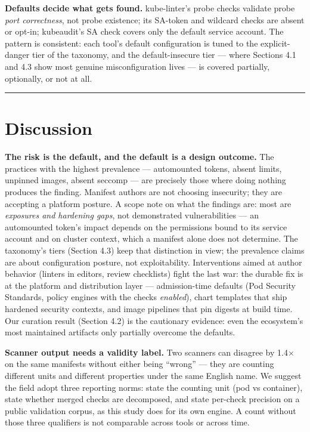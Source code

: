 \documentclass[pdflatex,sn-basic]{sn-jnl}
\begin{document}
\textbf{Defaults decide what gets found.} kube-linter's probe checks
validate probe \emph{port correctness}, not probe existence; its
SA-token and wildcard checks are absent or opt-in; kubeaudit's SA check
covers only the default service account. The pattern is consistent: each
tool's default configuration is tuned to the explicit-danger tier of the
taxonomy, and the default-insecure tier --- where Sections 4.1 and 4.3
show most genuine misconfiguration lives --- is covered partially,
optionally, or not at all.

\FloatBarrier

\begin{center}\rule{0.5\linewidth}{0.5pt}\end{center}

\hypertarget{discussion}{%
\section{Discussion}\label{discussion}}

\textbf{The risk is the default, and the default is a design outcome.}
The practices with the highest prevalence --- automounted tokens, absent
limits, unpinned images, absent seccomp --- are precisely those where
doing nothing produces the finding. Manifest authors are not choosing
insecurity; they are accepting a platform posture. A scope note on what
the findings are: most are \emph{exposures and hardening gaps}, not
demonstrated vulnerabilities --- an automounted token's impact depends
on the permissions bound to its service account and on cluster context,
which a manifest alone does not determine. The taxonomy's tiers (Section
4.3) keep that distinction in view; the prevalence claims are about
configuration posture, not exploitability. Interventions aimed at author
behavior (linters in editors, review checklists) fight the last war: the
durable fix is at the platform and distribution layer --- admission-time
defaults (Pod Security Standards, policy engines with the checks
\emph{enabled}), chart templates that ship hardened security contexts,
and image pipelines that pin digests at build time. Our curation result
(Section 4.2) is the cautionary evidence: even the ecosystem's most
maintained artifacts only partially overcome the defaults.

\textbf{Scanner output needs a validity label.} Two scanners can
disagree by 1.4$\times$ on the same manifests without either being ``wrong''
--- they are counting different units and different properties under the
same English name. We suggest the field adopt three reporting norms:
state the counting unit (pod vs container), state whether merged checks
are decomposed, and state per-check precision on a public validation
corpus, as this study does for its own engine. A count without those
three qualifiers is not comparable across tools or across time.
\end{document}
